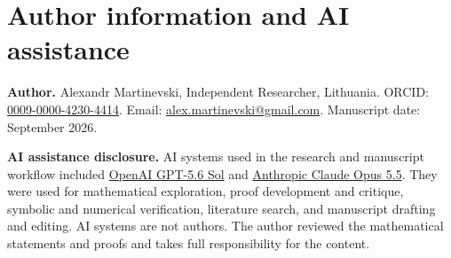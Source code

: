 \documentclass[11pt]{article}
\theoremstyle{definition}\newtheorem{definition}[theorem]{Definition}
\theoremstyle{remark}\newtheorem{remark}[theorem]{Remark}
\begin{document}
\section*{Author information and AI assistance}
\noindent
\textbf{Author.} Alexandr Martinevski, Independent Researcher, Lithuania. ORCID:
\href{https://orcid.org/0009-0000-4230-4414}{0009-0000-4230-4414}.
Email: \href{mailto:alex.martinevski@gmail.com}{alex.martinevski@gmail.com}.
Manuscript date: September 2026.

\medskip
\noindent
\textbf{AI assistance disclosure.} AI systems used in the research and manuscript workflow included
\href{https://openai.com/index/gpt-5-6/}{OpenAI GPT-5.6 Sol} and
\href{https://www.anthropic.com/claude-opus-5-5}{Anthropic Claude Opus 5.5}.
They were used for mathematical exploration, proof development and critique, symbolic and numerical verification,
literature search, and manuscript drafting and editing. AI systems are not authors. The author reviewed the
mathematical statements and proofs and takes full responsibility for the content.
\end{document}
